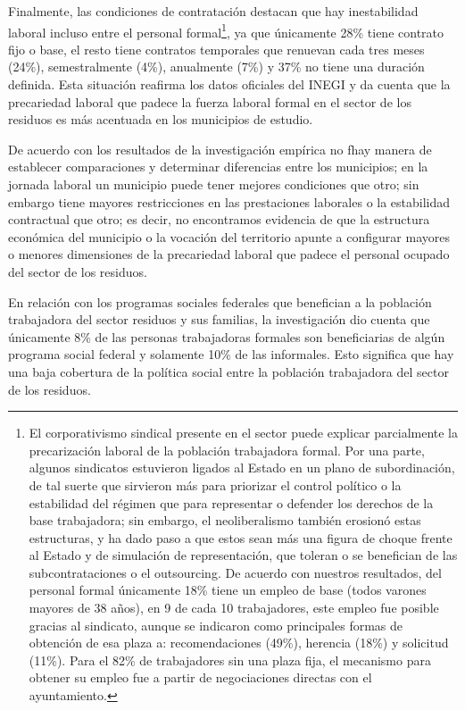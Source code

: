 \documentclass[
  spanish,
  11pt,
  a4paper,
]{scrbook}
\begin{document}
Finalmente, las condiciones de contratación destacan que hay
inestabilidad laboral incluso entre el personal formal\footnote{El
  corporativismo sindical presente en el sector puede explicar
  parcialmente la precarización laboral de la población trabajadora
  formal. Por una parte, algunos sindicatos estuvieron ligados al Estado
  en un plano de subordinación, de tal suerte que sirvieron más para
  priorizar el control político o la estabilidad del régimen que para
  representar o defender los derechos de la base trabajadora; sin
  embargo, el neoliberalismo también erosionó estas estructuras, y ha
  dado paso a que estos sean más una figura de choque frente al Estado y
  de simulación de representación, que toleran o se benefician de las
  subcontrataciones o el outsourcing. De acuerdo con nuestros
  resultados, del personal formal únicamente 18\% tiene un empleo de
  base (todos varones mayores de 38 años), en 9 de cada 10 trabajadores,
  este empleo fue posible gracias al sindicato, aunque se indicaron como
  principales formas de obtención de esa plaza a: recomendaciones
  (49\%), herencia (18\%) y solicitud (11\%). Para el 82\% de
  trabajadores sin una plaza fija, el mecanismo para obtener su empleo
  fue a partir de negociaciones directas con el ayuntamiento.}, ya que
únicamente 28\% tiene contrato fijo o base, el resto tiene contratos
temporales que renuevan cada tres meses (24\%), semestralmente (4\%),
anualmente (7\%) y 37\% no tiene una duración definida. Esta situación
reafirma los datos oficiales del INEGI y da cuenta que la precariedad
laboral que padece la fuerza laboral formal en el sector de los residuos
es más acentuada en los municipios de estudio.

De acuerdo con los resultados de la investigación empírica no fhay
manera de establecer comparaciones y determinar diferencias entre los
municipios; en la jornada laboral un municipio puede tener mejores
condiciones que otro; sin embargo tiene mayores restricciones en las
prestaciones laborales o la estabilidad contractual que otro; es decir,
no encontramos evidencia de que la estructura económica del municipio o
la vocación del territorio apunte a configurar mayores o menores
dimensiones de la precariedad laboral que padece el personal ocupado del
sector de los residuos.

En relación con los programas sociales federales que benefician a la
población trabajadora del sector residuos y sus familias, la
investigación dio cuenta que únicamente 8\% de las personas trabajadoras
formales son beneficiarias de algún programa social federal y solamente
10\% de las informales. Esto significa que hay una baja cobertura de la
política social entre la población trabajadora del sector de los
residuos.
\end{document}
